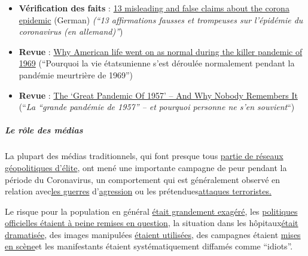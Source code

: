 \begin{itemize}
{  perdre leurs moyens de subsistance}.
\item
  \textbf{Vérification des faits} :
  \href{https://www.infosperber.ch/Artikel/Gesundheit/13-irrefuhrende-und-falsche-Behauptungen-zur-Corona-Epidemie}{13
  misleading and false claims about the corona epidemic} (German)
  \emph{(``13 affirmations fausses et trompeuses sur l'épidémie du
  coronavirus (en allemand)''})
\item
  \textbf{Revue} :
  \href{https://nypost.com/2020/05/16/why-life-went-on-as-normal-during-the-killer-pandemic-of-1969/}{Why
  American life went on as normal during the killer pandemic of 1969}
  (``Pourquoi la vie étatsunienne s'est déroulée normalement pendant la
  pandémie meurtrière de 1969'')
\item
  \textbf{Revue} :
  \href{http://www.ronpaulinstitute.org/archives/featured-articles/2020/may/06/the-great-pandemic-of-1957-and-why-nobody-remembers-it/}{The
  `Great Pandemic Of 1957' -- And Why Nobody Remembers It} (``\emph{La
  ``grande pandémie de 1957'' -- et pourquoi personne ne s'en
  souvient}``)
\end{itemize}

\hypertarget{le-ruxf4le-des-muxe9dias}{%
\subparagraph{\texorpdfstring{\textbf{Le rôle des
médias}}{Le rôle des médias}}\label{le-ruxf4le-des-muxe9dias}}

La plupart des médias traditionnels, qui font presque tous
\href{https://swprs.org/the-american-empire-and-its-media/}{partie de
réseaux géopolitiques d'élite}, ont mené une importante campagne de peur
pendant la période du Coronavirus, un comportement qui est généralement
observé en relation
avec\href{https://www.infosperber.ch/Artikel/Gesundheit/13-irrefuhrende-und-falsche-Behauptungen-zur-Corona-Epidemie}{les
guerres} d'\href{https://swprs.org/the-syria-deception/}{agression} ou
les
prétendues\href{https://www.motherjones.com/politics/2013/01/terror-factory-fbi-trevor-aaronson-book/}{attaques
terroristes.}

Le risque pour la population en général
\href{https://www.infosperber.ch/index.cfm?go=Artikel/Gesundheit/13-irrefuhrende-und-falsche-Behauptungen-zur-Corona-Epidemie/}{était
grandement exagéré}, les
\href{https://www.zora.uzh.ch/id/eprint/186723/1/jarren_corona.pdf}{politiques
officielles étaient à peine remises en question}, la situation dans les
hôpitaux\href{https://www.globalresearch.ca/truth-behind-refrigerated-morgue-truck-stories/5711475}{était
dramatisée}, des images manipulées
\href{https://nypost.com/2020/04/01/cbs-admits-to-using-footage-from-italy-in-report-about-nyc/}{étaient
utilisées}, des campagnes étaient
\href{https://www.youtube.com/watch?v=oQWRCECbN-Y}{mises en scène}et les
manifestants étaient systématiquement diffamés comme ``idiots''.


